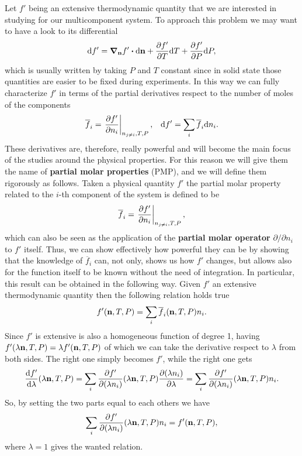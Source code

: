 Let $f'$ being an extensive thermodynamic quantity that we are interested in studying for our multicomponent system. To approach this problem we may want to have a look to its differential
\begin{equation}
    \dd f' = \grad_{\vb{n}}f' \vdot \dd \vb{n} + \pdv{f'}{T}\dd T + \pdv{f'}{P}\dd P,
\end{equation}
which is usually written by taking $P$ and $T$ constant since in solid state those quantities are easier to be fixed during experiments. In this way we can fully characterize $f'$ in terms of the partial derivatives respect to the number of moles of the components
\begin{align}
    \label{eq:PQdifferential}
    & \overline{f}_i = \eval{\pdv{f'}{n_i}}_{n_{j\neq i}, T, P}, & \dd f' = \sum_i \overline{f}_i\dd n_i.
\end{align}
These derivatives are, therefore, really powerful and will become the main focus of the studies around the physical properties. For this reason we will give them the name of \textbf{partial molar properties} (PMP), and we will define them rigorously as follows.
{
    Taken a physical quantity $f'$ the partial molar property related to the $i$-th component of the system is defined to be
    \begin{equation}
        \overline{f}_i = \eval{\pdv{f'}{n_i}}_{n_{j\neq i}, T, P},
    \end{equation}
    which can also be seen as the application of the \textbf{partial molar operator} $\partial/\partial n_i$ to $f'$ itself.
}
\noindent
Thus, we can show effectively how powerful they can be by showing that the knowledge of $\overline{f}_i$ can, not only, shows us how $f'$ changes, but allows also for the function itself to be known without the need of integration. In particular, this result can be obtained in the following way.
{
    Given $f'$ an extensive thermodynamic quantity then the following relation holds true
    \begin{equation}
        \label{eq:PMPproperty1}
        f'(\vb{n}, T, P) = \sum_i \overline{f}_i(\vb{n}, T, P) n_i.
    \end{equation}
}
{
    Since $f'$ is extensive is also a homogeneous function of degree 1, having $f'(\lambda\vb{n}, T, P) = \lambda f'(\vb{n}, T, P)$ of which we can take the derivative respect to $\lambda$ from both sides. The right one simply becomes $f'$, while the right one gets
    \begin{equation}
        \frac{\dd f'}{\dd \lambda}(\lambda\vb{n}, T, P) = \sum_i \frac{\partial f'}{\partial (\lambda n_i)}(\lambda\vb{n}, T, P) \pdv{(\lambda n_i)}{\lambda} = \sum_i \frac{\partial f'}{\partial (\lambda n_i)}(\lambda\vb{n}, T, P) n_i.
    \end{equation}
    So, by setting the two parts equal to each others we have
    \begin{equation}
        \sum_i \frac{\partial f'}{\partial(\lambda n_i)}(\lambda\vb{n}, T, P) n_i = f'(\vb{n}, T, P),
    \end{equation}
    where $\lambda = 1$ gives the wanted relation.
}

